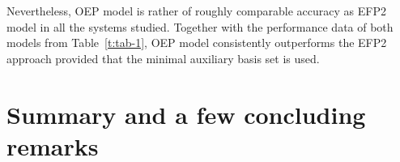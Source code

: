 \documentclass[aip,jcp,amsmath,amssymb,preprint,floatfix]{revtex4-1}
\begin{document}
%
%
%
% 
%
Nevertheless,
OEP model is rather of roughly comparable accuracy as EFP2 model in all the systems studied.
Together with the performance data of both models
from Table~\ref{t:tab-1}, OEP model consistently outperforms the
EFP2 approach provided
that the minimal auxiliary basis set is used.

\section{\label{s:6.conclusions}Summary and a few concluding remarks}
\end{document}
